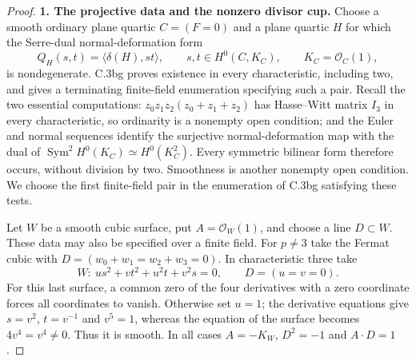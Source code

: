 \begin{proof}
\textbf{1. The projective data and the nonzero divisor cup.}
Choose a smooth ordinary plane quartic $C=(F=0)$ and a plane quartic
$H$ for which the Serre-dual normal-deformation form
\[
 Q_H(s,t)=\langle\delta(H),st\rangle,
 \qquad s,t\in H^0(C,K_C),\qquad K_C=\mathcal O_C(1),
 \tag{C.3bj.2}
\]
is nondegenerate. C.3bg proves existence in every characteristic,
including two, and gives a terminating finite-field enumeration
specifying such a pair. Recall the two essential computations:
$z_0z_1z_2(z_0+z_1+z_2)$ has Hasse--Witt matrix $I_3$ in every
characteristic, so ordinarity is a nonempty open condition; and the
Euler and normal sequences identify the surjective normal-deformation
map with the dual of
$\operatorname{Sym}^2H^0(K_C)\simeq H^0(K_C^2)$.
Every symmetric bilinear form therefore occurs, without division by two.
Smoothness is another nonempty open condition. We choose the first
finite-field pair in the enumeration of C.3bg satisfying these tests.

Let $W$ be a smooth cubic surface, put $A=\mathcal O_W(1)$, and
choose a line $D\subset W$. These data may also be specified over a
finite field. For $p\ne3$ take the Fermat cubic with
$D=(w_0+w_1=w_2+w_3=0)$. In characteristic three take
\[
 W:\ u s^2+v t^2+u^2t+v^2s=0,\qquad D=(u=v=0).
 \tag{C.3bj.3}
\]
For this last surface, a common zero of the four derivatives with a
zero coordinate forces all coordinates to vanish. Otherwise set $u=1$;
the derivative equations give $s=v^2$, $t=v^{-1}$ and $v^5=1$,
whereas the equation of the surface becomes $4v^4=v^4\ne0$.
Thus it is smooth. In all cases $A=-K_W$, $D^2=-1$ and $A\cdot D=1$.


\end{proof}
